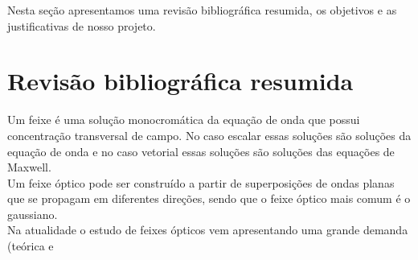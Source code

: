 

Nesta seção apresentamos  uma revisão bibliográfica resumida, os objetivos e as justificativas  de nosso projeto.
\section{Revisão bibliográfica resumida}
Um feixe é uma solução monocromática da equação de onda que possui concentração transversal de campo. No caso escalar essas soluções são soluções da equação de onda e no caso vetorial essas soluções são soluções das equações de Maxwell.\\
Um feixe óptico pode ser construído a partir de superposições de ondas planas que se propagam em diferentes direções, sendo que o feixe óptico mais comum é o gaussiano.\\
Na atualidade o estudo de feixes ópticos vem apresentando uma grande demanda (teórica e 
